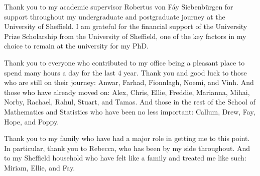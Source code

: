 \begin{acknowledgementslong}

Thank you to my academic supervisor Robertus von F\'{a}y Siebenb\"{u}rgen for support throughout my undergraduate and postgraduate journey at the University of Sheffield. I am grateful for the financial support of the University Prize Scholarship from the University of Sheffield, one of the key factors in my choice to remain at the university for my PhD.

Thank you to everyone who contributed to my office being a pleasant place to spend many hours a day for the last 4 year. Thank you and good luck to those who are still on their journey: Anwar, Farhad, Fionnlagh, Noemi, and Vinh. And those who have already moved on: Alex, Chris, Ellie, Freddie, Marianna, Mihai, Norby, Rachael, Rahul, Stuart, and Tamas. And those in the rest of the School of Mathematics and Statistics who have been no less important: Callum, Drew, Fay, Hope, and Poppy.

Thank you to my family who have had a major role in getting me to this point. In particular, thank you to Rebecca, who has been by my side throughout. And to my Sheffield household who have felt like a family and treated me like such: Miriam, Ellie, and Fay.

\end{acknowledgementslong}